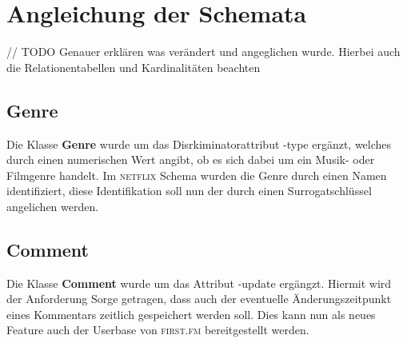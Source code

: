 \documentclass[11pt,a4paper,DIV=9]{scrartcl}
\begin{document}

\section{Angleichung der Schemata}
// TODO Genauer erklären was verändert und angeglichen wurde. Hierbei auch die Relationentabellen und Kardinalitäten beachten
  \subsection{Genre} 
    Die Klasse \textbf{Genre} wurde um das Disrkiminatorattribut -type ergänzt, welches durch einen numerischen Wert angibt, ob es sich dabei um ein Musik- oder Filmgenre handelt. Im \textsc{netflix} Schema wurden die Genre durch einen Namen identifiziert, diese Identifikation soll nun der durch einen Surrogatschlüssel angelichen werden.
  \subsection{Comment}
    Die Klasse \textbf{Comment} wurde um das Attribut -update ergängzt. Hiermit wird der Anforderung Sorge getragen, dass auch der eventuelle Änderungszeitpunkt eines Kommentars zeitlich gespeichert werden soll. Dies kann nun als neues Feature auch der Userbase von \textsc{first.fm} bereitgestellt werden.
    
\end{document}
